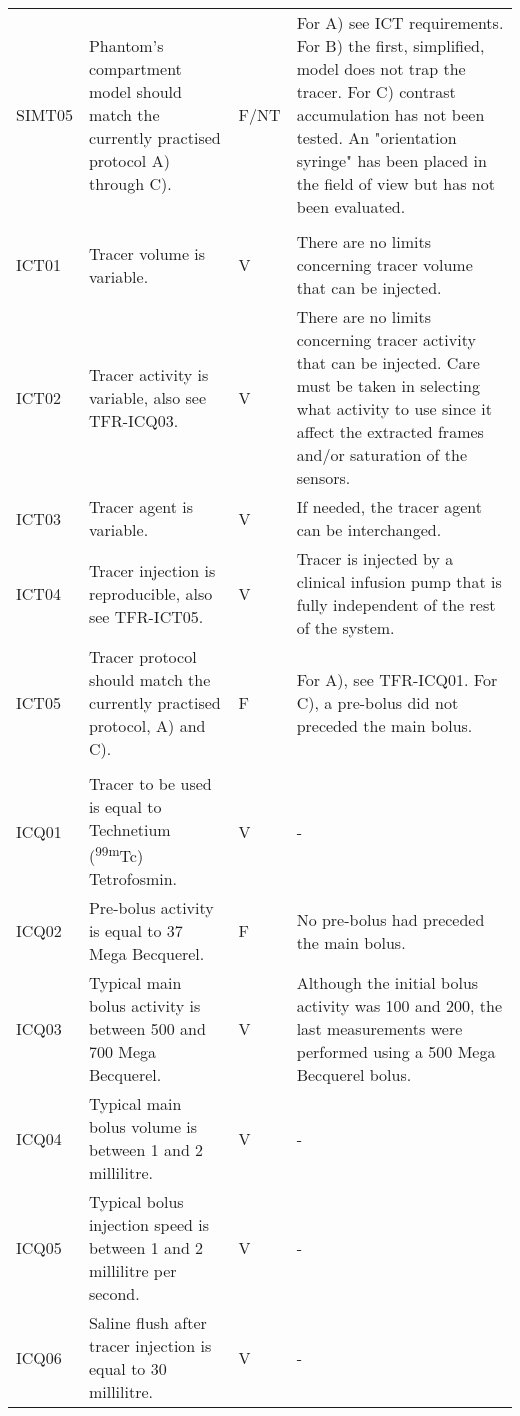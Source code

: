 \begin{longtable}{m{1.5cm}|m{5.25cm}>{\centering\arraybackslash}m{1cm}m{5.75cm}|}
		SIMT05	& Phantom's compartment model should match the currently practised protocol A) through C). & \cellcolor{orange!50}F/NT & For A) see ICT requirements. For B) the first, simplified, model does not trap the tracer. For C) contrast accumulation has not been tested. An "orientation syringe" has been placed in the field of view but has not been evaluated. \\
					& & & \\
		ICT01	&  Tracer volume is variable. & \cellcolor{green!50}V & There are no limits concerning tracer volume that can be injected. \\
		ICT02	& Tracer activity is variable, also see TFR-ICQ03. & \cellcolor{green!50}V & There are no limits concerning tracer activity that can be injected. Care must be taken in selecting what activity to use since it affect the extracted frames and/or saturation of the sensors. \\
		ICT03	& Tracer agent is variable. & \cellcolor{green!50}V & If needed, the tracer agent can be interchanged. \\
		ICT04	& Tracer injection is reproducible, also see TFR-ICT05. & \cellcolor{green!50}V & Tracer is injected by a clinical infusion pump that is fully independent of the rest of the system. \\
		ICT05	& Tracer protocol should match the currently practised protocol, A) and C). & \cellcolor{red!50}F & For A), see TFR-ICQ01. For C), a pre-bolus did not preceded the main bolus. \\
					& & & \\
		ICQ01	& Tracer to be used is equal to Technetium (\textsuperscript{99m}Tc) Tetrofosmin. & \cellcolor{green!50}V & - \\
		ICQ02	& Pre-bolus activity is equal to 37 Mega Becquerel. & \cellcolor{red!50}F & No pre-bolus had preceded the main bolus. \\
		ICQ03	& Typical main bolus activity is between 500 and 700 Mega Becquerel. & \cellcolor{green!50}V & Although the initial bolus activity was 100 and 200, the last measurements were performed using a 500 Mega Becquerel bolus. \\
		ICQ04	& Typical main bolus volume is between 1 and 2 millilitre. & \cellcolor{green!50}V & - \\
		ICQ05	& Typical bolus injection speed is between 1 and 2 millilitre per second. & \cellcolor{green!50}V & - \\
		ICQ06	& Saline flush after tracer injection is equal to 30 millilitre. & \cellcolor{green!50}V  & - \\
		\end{longtable}
		
